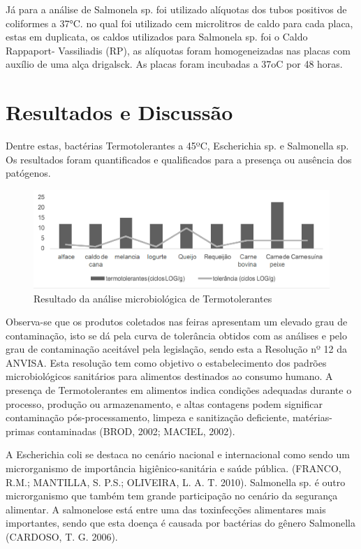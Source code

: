 \documentclass[article,12pt,onesidea,4paper,english,brazil]{abntex2}
\begin{document}
Já para a análise de Salmonela sp. foi utilizado alíquotas dos tubos positivos de coliformes a 37°C. no qual foi utilizado cem microlitros de caldo para cada placa, estas em duplicata, os caldos utilizados para Salmonela sp. foi o Caldo Rappaport- Vassiliadis (RP), as alíquotas foram homogeneizadas nas placas com auxílio de uma alça drigalsck. As placas foram incubadas a 37oC por 48 horas.
	
	\section*{Resultados e Discussão}
	
Dentre estas, bactérias Termotolerantes a 45ºC, Escherichia sp. e Salmonella sp. Os resultados foram quantificados e qualificados para a presença ou ausência dos patógenos.

\begin{figure}[!h]
	\centering
	\includegraphics[width=.8\linewidth]{pip-167-01}
	\caption{Resultado da análise microbiológica de Termotolerantes}
\end{figure}

Observa-se que os produtos coletados nas feiras apresentam um elevado grau de contaminação, isto se dá pela curva de tolerância obtidos com as análises e pelo grau de contaminação aceitável pela legislação, sendo esta a Resolução nº 12 da ANVISA. Esta resolução tem como objetivo o estabelecimento dos padrões microbiológicos sanitários para alimentos destinados ao consumo humano. A presença de Termotolerantes em alimentos indica condições adequadas durante o processo, produção ou armazenamento, e altas contagens podem significar contaminação pós-processamento, limpeza e sanitização deficiente, matérias-primas contaminadas (BROD, 2002; MACIEL, 2002).

A Escherichia coli se destaca no cenário nacional e internacional como sendo um microrganismo de importância higiênico-sanitária e saúde pública. (FRANCO, R.M.; MANTILLA, S. P.S.; OLIVEIRA, L. A. T. 2010). Salmonella sp. é outro
microrganismo que também tem grande participação no cenário da segurança alimentar. A salmonelose está entre uma das toxinfecções alimentares mais importantes, sendo que esta doença é causada por bactérias do gênero Salmonella (CARDOSO, T. G. 2006).
\end{document}
